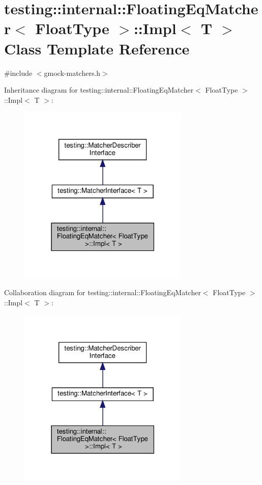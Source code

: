 \hypertarget{classtesting_1_1internal_1_1_floating_eq_matcher_1_1_impl}{}\section{testing\+:\+:internal\+:\+:Floating\+Eq\+Matcher$<$ Float\+Type $>$\+:\+:Impl$<$ T $>$ Class Template Reference}
\label{classtesting_1_1internal_1_1_floating_eq_matcher_1_1_impl}


{\ttfamily \#include $<$gmock-\/matchers.\+h$>$}



Inheritance diagram for testing\+:\+:internal\+:\+:Floating\+Eq\+Matcher$<$ Float\+Type $>$\+:\+:Impl$<$ T $>$\+:
\nopagebreak
\begin{figure}[H]
\begin{center}
\leavevmode
\includegraphics[width=231pt]{classtesting_1_1internal_1_1_floating_eq_matcher_1_1_impl__inherit__graph}
\end{center}
\end{figure}


Collaboration diagram for testing\+:\+:internal\+:\+:Floating\+Eq\+Matcher$<$ Float\+Type $>$\+:\+:Impl$<$ T $>$\+:
\nopagebreak
\begin{figure}[H]
\begin{center}
\leavevmode
\includegraphics[width=231pt]{classtesting_1_1internal_1_1_floating_eq_matcher_1_1_impl__coll__graph}
\end{center}
\end{figure}
